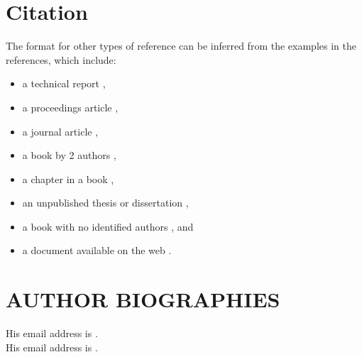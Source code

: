 \documentclass{wscpaperproc}
\theoremstyle{wsc}
\begin{document}
\section{Citation}

The format for other types of reference can be inferred from the examples in the references, which include:
\begin{itemize}
\item a technical report \cite{chi89},
\item a proceedings article \cite{cheng:input94},
\item a journal article \cite{gupta:mnormal},
\item a book by 2 authors \cite{hammersley:montecarlo},
\item a chapter in a book \cite{sch79},
\item an unpublished thesis or dissertation \cite{ste99},
\item a book with no identified authors \cite{chicago03}, and
\item a document available on the web \cite{Foundation}.
\end{itemize}




\section*{AUTHOR BIOGRAPHIES}

 His email address is .\\
 His email address is .\\
\end{document}
